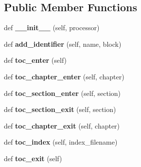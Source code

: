 \subsection*{Public Member Functions}
\begin{DoxyCompactItemize}
\item 
\mbox{\label{classformatter_1_1_formatter_a5de494c2e4417906cb4e120df5d18bcc}} 
def {\bfseries \+\_\+\+\_\+init\+\_\+\+\_\+} (self, processor)
\item 
\mbox{\label{classformatter_1_1_formatter_ab6acac0b3d63fafcbfc7eb5a5f3a490a}} 
def {\bfseries add\+\_\+identifier} (self, name, block)
\item 
\mbox{\label{classformatter_1_1_formatter_a166650d68b5f8e5bde52e67e429b339e}} 
def {\bfseries toc\+\_\+enter} (self)
\item 
\mbox{\label{classformatter_1_1_formatter_ac6ae02e7e057cfd8808dd9c0c2a43011}} 
def {\bfseries toc\+\_\+chapter\+\_\+enter} (self, chapter)
\item 
\mbox{\label{classformatter_1_1_formatter_a2b002bb2af465345fecf38413d8faf4a}} 
def {\bfseries toc\+\_\+section\+\_\+enter} (self, section)
\item 
\mbox{\label{classformatter_1_1_formatter_a7f767d0870cc1740d75df4b5e7abeec4}} 
def {\bfseries toc\+\_\+section\+\_\+exit} (self, section)
\item 
\mbox{\label{classformatter_1_1_formatter_a7f679dfef1e94b284a1b8a00b1555271}} 
def {\bfseries toc\+\_\+chapter\+\_\+exit} (self, chapter)
\item 
\mbox{\label{classformatter_1_1_formatter_a0f439ac1734147acff4edb8dcdaf3e80}} 
def {\bfseries toc\+\_\+index} (self, index\+\_\+filename)
\item 
\mbox{\label{classformatter_1_1_formatter_a0cc83dbfda080feabb1d21941d226a9d}} 
def {\bfseries toc\+\_\+exit} (self)
\item 

\end{DoxyCompactItemize}
